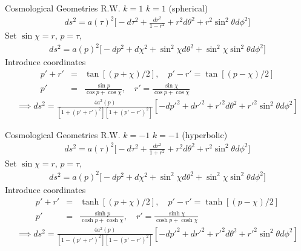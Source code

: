 \documentclass[8pt]{beamer}
\begin{document}
\begin{frame}{Cosmological Geometries R.W. $k=1$}
	$k=1$ (spherical)
	\begin{eqnarray*}
		ds^2 = a(\tau)^2\bigg[-d\tau^2 + \frac{dr^2}{1-r^2} + r^2 d\theta^2 + r^2 \sin^2\theta d\phi^2\bigg]
	\end{eqnarray*}	
	Set $\sin\chi = r$, $p = \tau$, 
	\begin{eqnarray*}
		ds^2 = a(p)^2\bigg[-dp^2 + d\chi^2 + \sin^2\chi d\theta^2 + \sin^2\chi \sin^2\theta d\phi^2\bigg]
	\end{eqnarray*}
	Introduce coordinates
	\begin{eqnarray*}
			p' + r' &=& \tan[(p+\chi)/2],\quad p'-r'=\tan[(p-\chi)/2]
			\nonumber\\
			p' &=& \frac{\sin p}{\cos p + \cos \chi}, \quad r' = \frac{\sin\chi}{\cos p + \cos\chi}
	\end{eqnarray*}
	\begin{eqnarray*}
	\implies ds^2 = \frac{4a^2(p)}{[1+(p'+r')^2][1+(p'-r')^2]}[-dp'^2 + dr'^2 +r'^2 d\theta^2 + r'^2\sin^2\theta d\phi^2]
	\end{eqnarray*}
\end{frame}


\begin{frame}{Cosmological Geometries R.W. $k=-1$}
	$k=-1$ (hyperbolic)
	\begin{eqnarray*}
		ds^2 = a(\tau)^2\bigg[-d\tau^2 + \frac{dr^2}{1+r^2}  + r^2 d\theta^2 + r^2 \sin^2\theta d\phi^2\bigg]
	\end{eqnarray*}	
	Set $\sin\chi = r$, $p = \tau$, 
	\begin{eqnarray*}
		ds^2 = a(p)^2\bigg[-dp^2 + d\chi^2 + \sin^2\chi d\theta^2 + \sin^2\chi \sin^2\theta d\phi^2\bigg]
	\end{eqnarray*}
	Introduce coordinates
	\begin{eqnarray*}
		p' + r' &=& \tanh[(p+\chi)/2],\quad p'-r'=\tanh[(p-\chi)/2]
		\nonumber\\
		p' &=& \frac{\sinh p}{\cosh p + \cosh \chi}, \quad r' = \frac{\sinh\chi}{\cosh p + \cosh\chi}
	\end{eqnarray*}
	\begin{eqnarray*}
	\implies ds^2 = \frac{4a^2(p)}{[1-(p'+r')^2][1-(p'-r')^2]}[-dp'^2 + dr'^2 +r'^2 d\theta^2 + r'^2\sin^2\theta d\phi^2]
	\end{eqnarray*}
\end{frame}
\end{document}
